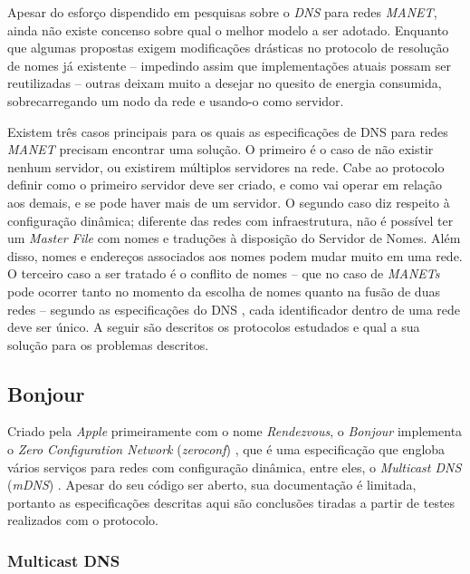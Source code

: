 
Apesar do esforço dispendido em pesquisas sobre o \textit{DNS} para redes \textit{MANET}, ainda não existe concenso sobre qual o melhor modelo a ser adotado. Enquanto que algumas propostas exigem modificações drásticas no protocolo de resolução de nomes já existente -- impedindo assim que implementações atuais possam ser reutilizadas -- outras deixam muito a desejar no quesito de energia consumida, sobrecarregando um nodo da rede e usando-o como servidor.

Existem três casos principais para os quais as especificações de DNS para redes \textit{MANET} precisam encontrar uma solução. O primeiro é o caso de não existir nenhum servidor, ou existirem múltiplos servidores na rede. Cabe ao protocolo definir como o primeiro servidor deve ser criado, e como vai operar em relação aos demais, e se pode haver mais de um servidor. O segundo caso diz respeito à configuração dinâmica; diferente das redes com infraestrutura, não é possível ter um \textit{Master File} com nomes e traduções à disposição do Servidor de Nomes. Além disso, nomes e endereços associados aos nomes podem mudar muito em uma rede. O terceiro caso a ser tratado é o conflito de nomes -- que no caso de \textit{MANETs} pode ocorrer tanto no momento da escolha de nomes quanto na fusão de duas redes -- segundo as especificações do DNS \cite{rfc1035}, cada identificador dentro de uma rede deve ser único. A seguir são descritos os protocolos estudados e qual a sua solução para os problemas descritos.

\subsection{Bonjour}

  Criado pela \textit{Apple} primeiramente com o nome \textit{Rendezvous}, o \textit{Bonjour} implementa o \textit{Zero Configuration Network} (\textit{zeroconf}) \cite{zeroconf}, que é uma especificação que engloba vários serviços para redes com configuração dinâmica, entre eles, o \textit{Multicast DNS} (\textit{mDNS}) \cite{mdns}. Apesar do seu código ser aberto, sua documentação é limitada, portanto as especificações descritas aqui são conclusões tiradas a partir de testes realizados com o protocolo.
  
  \subsubsection{Multicast DNS}
  
